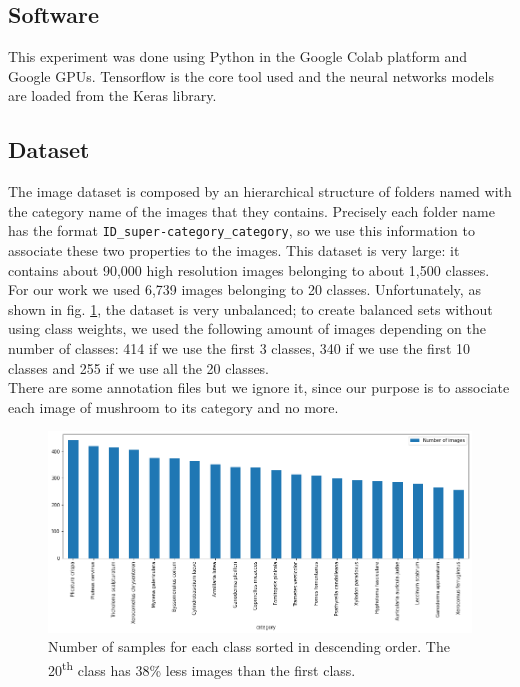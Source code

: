 \documentclass[12pt]{llncs}
\begin{document}
\subsection{Software}
This experiment was done using Python in the Google Colab platform \cite{colab} and Google GPUs. Tensorflow \cite{tensorflow} is the core tool used and the neural networks models are loaded from the Keras library.

\subsection{Dataset}
The image dataset is composed by an hierarchical structure of folders named with the category name of the images that they contains. Precisely each folder name has the format \texttt{ID\_super-category\_category}, so we use this information to associate these two properties to the images. This dataset is very large: it contains about 90,000 high resolution images belonging to about 1,500 classes. For our work we used 6,739 images belonging to 20 classes. Unfortunately, as shown in fig. \ref{fig:classes}, the dataset is very unbalanced; to create balanced sets without using class weights, we used the following amount of images depending on the number of classes: 414 if we use the first 3 classes, 340 if we use the first 10 classes and 255 if we use all the 20 classes.\\
There are some annotation files but we ignore it, since our purpose is to associate each image of mushroom to its category and no more.

\begin{figure}[h]
	\centering
	\includegraphics[width=\textwidth]{classes.png}
	\caption{Number of samples for each class sorted in descending order. The 20\textsuperscript{th} class has 38\% less images than the first class.}
	\label{fig:classes}
\end{figure}
\end{document}

